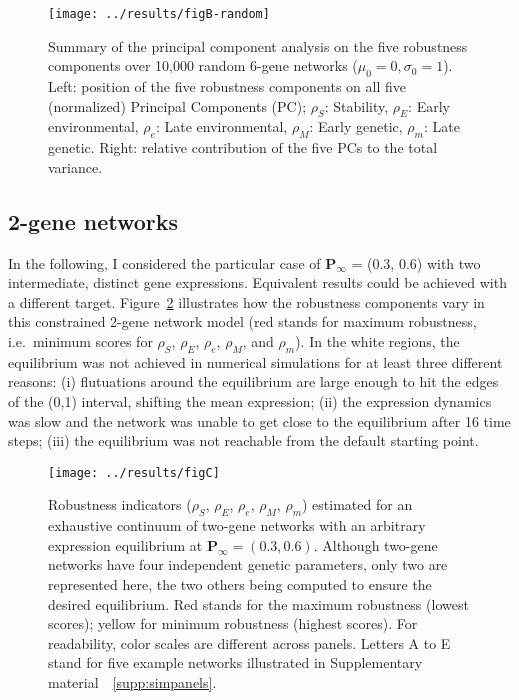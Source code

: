 \documentclass[10pt,a4paper]{article}
\newcommand{\stability}{{\rho_S}}
\newcommand{\earlyenv}{{\rho_E}}
\newcommand{\lateenv}{{\rho_e}}
\newcommand{\earlymut}{{\rho_M}}
\newcommand{\latemut}{{\rho_m}}
\newcommand{\SupMat}{Supplementary material~}
\begin{document}
\begin{figure}[t]
\begin{center}
\texttt{[image: ../results/figB-random]}
\caption{\color{Gray} \label{fig:pca} Summary of the principal component analysis on the five robustness components over 10,000 random 6-gene networks ($\mu_0=0, \sigma_0=1$). Left: position of the five robustness components on all five (normalized) Principal Components (PC); $\stability$: Stability, $\earlyenv$: Early environmental, $\lateenv$: Late environmental, $\earlymut$: Early genetic, $\latemut$: Late genetic. Right: relative contribution of the five PCs to the total variance.}
\end{center}
\end{figure}

\subsection{2-gene networks}

In the following, I considered the particular case of $\bm P_\infty$ = (0.3, 0.6) with two intermediate, distinct gene expressions. Equivalent results could be achieved with a different target. Figure~\ref{fig:imgpanels} illustrates how the robustness components vary in this constrained 2-gene network model (red stands for maximum robustness, i.e.\ minimum scores for $\stability$, $\earlyenv$, $\lateenv$, $\earlymut$, and $\latemut$). In the white regions, the equilibrium was not achieved in numerical simulations for at least three different reasons: (i) flutuations around the equilibrium are large enough to hit the edges of the (0,1) interval, shifting the mean expression; (ii) the expression dynamics was slow and the network was unable to get close to the equilibrium after 16 time steps; (iii) the equilibrium was not reachable from the default starting point.

\begin{figure}[t]
\begin{adjustwidth}{-1in}{0in}
\begin{flushright}
\texttt{[image: ../results/figC]}
\caption{\color{Gray} \label{fig:imgpanels} Robustness indicators ($\stability$, $\earlyenv$, $\lateenv$, $\earlymut$, $\latemut$) estimated for an exhaustive continuum of two-gene networks with an arbitrary expression equilibrium at $\bm P_\infty = (0.3, 0.6)$. Although two-gene networks have four independent genetic parameters, only two are represented here, the two others being computed to ensure the desired equilibrium. Red stands for the maximum robustness (lowest scores); yellow for minimum robustness (highest scores). For readability, color scales are different across panels. Letters A to E stand for five example networks illustrated in \SupMat~\ref{supp:simpanels}.}
\end{flushright}\end{adjustwidth}
\end{figure}
\end{document}
